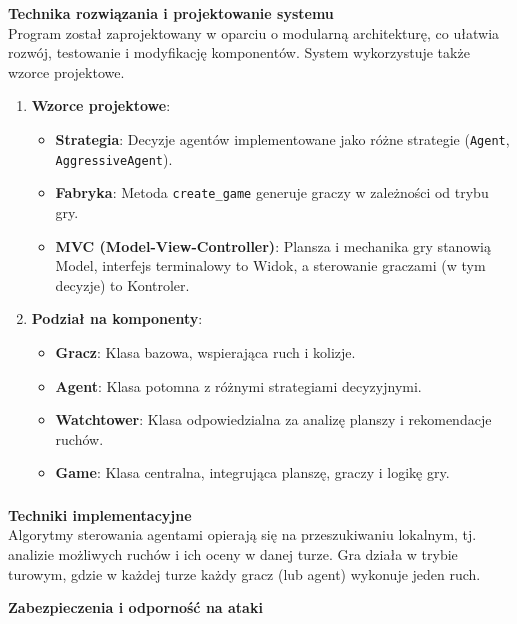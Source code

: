 \documentclass[12pt,a4paper]{article}
\begin{document}
\textbf{Technika rozwiązania i projektowanie systemu}\\
Program został zaprojektowany w oparciu o modularną architekturę, co ułatwia rozwój, testowanie i modyfikację komponentów. System wykorzystuje także wzorce projektowe.


\begin{enumerate}
    \item \textbf{Wzorce projektowe}:
    \begin{itemize}
        \item \textbf{Strategia}: Decyzje agentów implementowane jako różne strategie (\verb|Agent|, \verb|AggressiveAgent|).
        \item \textbf{Fabryka}: Metoda \verb|create_game| generuje graczy w zależności od trybu gry.
        \item \textbf{MVC (Model-View-Controller)}: Plansza i mechanika gry stanowią Model, interfejs terminalowy to Widok, a sterowanie graczami (w tym decyzje) to Kontroler.
    \end{itemize}
    \item \textbf{Podział na komponenty}:
    \begin{itemize}
        \item \textbf{Gracz}: Klasa bazowa, wspierająca ruch i kolizje.
        \item \textbf{Agent}: Klasa potomna z różnymi strategiami decyzyjnymi.
        \item \textbf{Watchtower}: Klasa odpowiedzialna za analizę planszy i rekomendacje ruchów.
        \item \textbf{Game}: Klasa centralna, integrująca planszę, graczy i logikę gry.
    \end{itemize}
\end{enumerate}

\subsubsection{}
\bigskip

\textbf{Techniki implementacyjne}\\
Algorytmy sterowania agentami opierają się na przeszukiwaniu lokalnym, tj. analizie możliwych ruchów i ich oceny w danej turze. Gra działa w trybie turowym, gdzie w każdej turze każdy gracz (lub agent) wykonuje jeden ruch.
\bigskip

\textbf{Zabezpieczenia i odporność na ataki}
\end{document}
